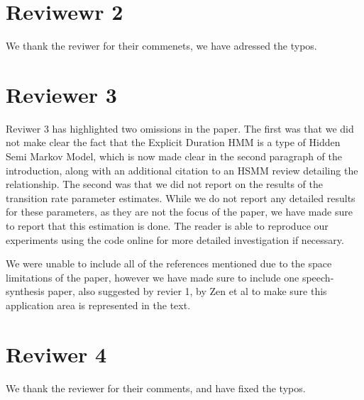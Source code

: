 \documentclass{article}
\begin{document}
\section*{Reviwewr 2}

We thank the reviwer for their commenets, we have adressed the typos. 

\section*{Reviewer 3}

Reviwer 3 has highlighted two omissions in the paper. The first was that we did not make clear the fact that the Explicit Duration HMM is a type of Hidden Semi Markov Model, which is now made clear in the second paragraph of the introduction, along with an additional citation to an HSMM review detailing the relationship. The second was that we did not report on the results of the transition rate parameter estimates. While we do not report any detailed results for these parameters, as they are not the focus of the paper, we have made sure to report that this estimation is done. The reader is able to reproduce our experiments using the code online for more detailed investigation if necessary. 

We were unable to include all of the references mentioned due to the space limitations of the paper, however we have made sure to include one speech-synthesis paper, also suggested by revier 1, by Zen et al to make sure this application area is represented in the text. 

\section*{Reviwer 4}

We thank the reviewer for their comments, and have fixed the typos. 
\end{document}
